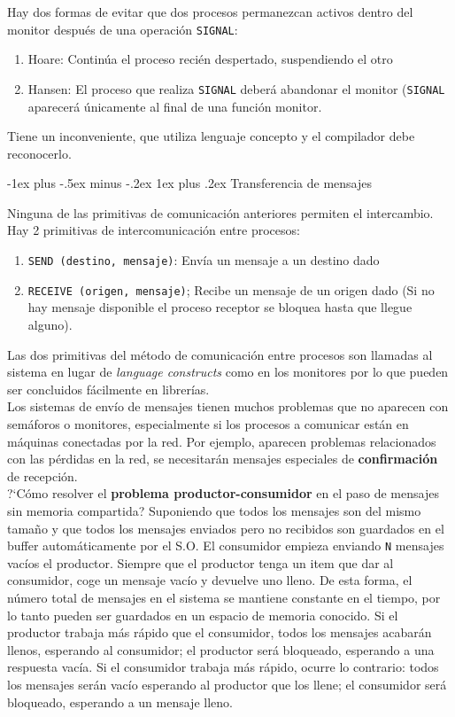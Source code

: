 \documentclass[10pt,portrait, twocolumn]{article}
\makeatletter
\renewcommand{\subsubsection}{\@startsection{subsubsection}{3}{0mm}%
                                {-1ex plus -.5ex minus -.2ex}%
                                {1ex plus .2ex}%
                                {\normalfont\small\bfseries}}
\makeatother
\begin{document}
Hay dos formas de evitar que dos procesos permanezcan activos dentro del monitor después de una operación \texttt{SIGNAL}:
	
	\begin{enumerate}
		\item Hoare: Continúa el proceso recién despertado, suspendiendo el otro
		\item Hansen: El proceso que realiza \texttt{SIGNAL} deberá abandonar el monitor (\texttt{SIGNAL} aparecerá únicamente al final de una función monitor.
	\end{enumerate}
	
Tiene un inconveniente, que utiliza lenguaje concepto y el compilador debe reconocerlo.
	
	
\subsubsection{Transferencia de mensajes}


Ninguna de las primitivas de comunicación anteriores permiten el intercambio. Hay 2 primitivas de intercomunicación entre procesos:

	\begin{enumerate}
		\item \texttt{SEND (destino, mensaje)}: Envía un mensaje a un destino dado
		\item \texttt{RECEIVE (origen, mensaje)}; Recibe un mensaje de un origen dado (Si no hay mensaje disponible el proceso receptor se bloquea hasta que llegue alguno).
	\end{enumerate}
	
Las dos primitivas del método de comunicación entre procesos son llamadas al sistema en lugar de \textit{language constructs} como en los monitores por lo que pueden ser concluidos fácilmente en librerías.\\

Los sistemas de envío de mensajes tienen muchos problemas que no aparecen con semáforos o monitores, especialmente si los procesos a comunicar están en máquinas conectadas por la red. Por ejemplo, aparecen problemas relacionados con las pérdidas en la red, se necesitarán mensajes especiales de \textbf{confirmación} de recepción.\\
  

?`Cómo resolver el \textbf{problema productor-consumidor} en el paso de mensajes sin memoria compartida? Suponiendo que todos los mensajes son del mismo tamaño y que todos los mensajes enviados pero no recibidos son guardados en el buffer automáticamente por el S.O.  El consumidor empieza enviando \texttt{N} mensajes vacíos el productor. Siempre que el productor tenga un item que dar al consumidor, coge un mensaje vacío y devuelve uno lleno. De esta forma, el número total de mensajes en el sistema se mantiene constante en el tiempo, por lo tanto pueden ser guardados en un espacio de memoria conocido. Si el productor  trabaja más rápido que el consumidor, todos los mensajes acabarán llenos, esperando al consumidor; el productor será bloqueado, esperando a una respuesta vacía. Si el consumidor trabaja más rápido, ocurre lo contrario: todos los mensajes serán vacío esperando al productor que los llene; el consumidor será bloqueado, esperando a un mensaje lleno.
\end{document}
